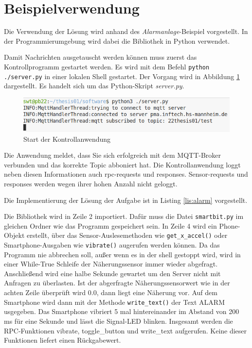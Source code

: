 \documentclass[11pt,a4paper]{report}
\begin{document}
\section{Beispielverwendung}
Die Verwendung der Lösung wird anhand des \textit{Alarmanlage}-Beispiel vorgestellt.
In der Programmierumgebung wird dabei die Bibliothek in Python verwendet.

Damit Nachrichten ausgetauscht werden können muss zuerst das Kontrollprogramm gestartet werden.
Es wird mit dem Befehl \texttt{python ./server.py} in einer lokalen Shell gestartet.
Der Vorgang wird in Abbildung \ref{fig:start_controll_app} dargestellt.
Es handelt sich um das Python-Skript \textit{server.py}.
\begin{figure}[htbp]
  \centering
  \includegraphics[width=.8\textwidth]{images/server_logging}
  \caption{Start der Kontrollanwendung}
  \label{fig:start_controll_app}
\end{figure}
Die Anwendung meldet, dass Sie sich erfolgreich mit dem MQTT-Broker verbunden und das korrekte Topic abboniert hat.
Die Kontrollanwendung loggt neben diesen Informationen auch rpc-requests und responses.
Sensor-requests und responses werden wegen ihrer hohen Anzahl nicht geloggt.

Die Implementierung der Lösung der Aufgabe ist in Listing \ref{lis:alarm} vorgestellt.

\lstset{language=python, captionpos=b, frame=single, numberstyle=\tiny, style=customcs}

Die Bibliothek wird in Zeile 2 importiert.
Dafür muss die Datei \texttt{smartbit.py} im gleichen Ordner wie das Programm gespeichert sein.
In Zeile 4 wird ein Phone-Objekt erstellt, über das Sensor-Auslesemethoden wie \texttt{get\_x\_accel()} oder Smartphone-Ausgaben wie \texttt{vibrate()} augerufen werden können.
Da das Programm nie abbrechen soll, außer wenn es in der shell gestoppt wird, wird in einer While-True Schleife der Näherungssensor immer wieder abgefragt.
Anschließend wird eine halbe Sekunde gewartet um den Server nicht mit Anfragen zu überlasten.
Ist der abgerfragte Näherungssensorwert wie in der achten Zeile überprüft wird 0.0, dann liegt eine Näherung vor.
Auf dem Smartphone wird dann mit der  Methode \texttt{write\_text()} der Text ALARM usgegeben.
Das Smartphone vibriert 5 mal hintereinander im Abstand von 200 ms für eine Sekunde und lässt die Signal-LED blinken.
Insgesamt werden die RPC-Funktionen vibrate, toggle\_button und write\_text aufgerufen.
Keine dieser Funktionen liefert einen Rückgabewert.
\end{document}
